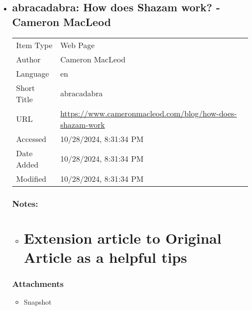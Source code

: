 \documentclass[twoside]{report}
\begin{document}
\begin{itemize}
  \begin{itemize}
  \tightlist
  \item
    \label{item_RQ6E6ET6}{PDF}
  \end{itemize}
\item
  \label{item_J7GZJFWB}
  \subsection{abracadabra: How does Shazam work? - Cameron
  MacLeod}\label{abracadabra-how-does-shazam-work---cameron-macleod}

  \begin{longtable}[]{@{}ll@{}}
  \toprule\noalign{}
  \endhead
  \bottomrule\noalign{}
  \endlastfoot
  Item Type & Web Page \\
  Author & Cameron MacLeod \\
  Language & en \\
  Short Title & abracadabra \\
  URL &
  \url{https://www.cameronmacleod.com/blog/how-does-shazam-work} \\
  Accessed & 10/28/2024, 8:31:34 PM \\
  Date Added & 10/28/2024, 8:31:34 PM \\
  Modified & 10/28/2024, 8:31:34 PM \\
  \end{longtable}

  \subsubsection{Notes:}\label{notes-2}

  \begin{itemize}
  \item
    \label{item_4QPJSP4E}
    \section{Extension article to Original Article as a helpful
    tips}\label{extension-article-to-original-article-as-a-helpful-tips}
  \end{itemize}

  \subsubsection{Attachments}\label{attachments-2}

  \begin{itemize}
  \tightlist
  \item
    \label{item_LYURUIEI}{Snapshot}
  \end{itemize}
\end{itemize}
\end{document}
